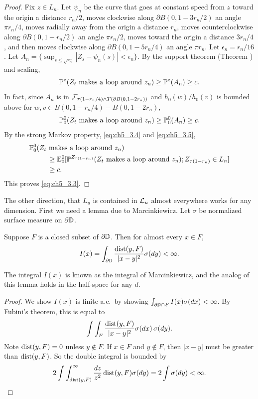 \begin{proof}
Fix $z \in L_n$. Let $\psi_n$ be the curve that goes at constant speed from $z$ toward the origin a distance $r_n/2$, moves clockwise along $\partial B(0,1-3r_n/2)$ an angle $\pi r_n/4$, moves radially away from the origin a distance $r_n$, moves counterclockwise along $\partial B(0,1-r_n/2)$ an angle $\pi r_n/2$, moves toward the origin a distance $3r_n/4$, and then moves clockwise along $\partial B(0,1-5r_n/4)$ an angle $\pi r_n$. Let $\epsilon_n = r_n/16$. Let $A_n = \{\sup_{s\leq\sqrt{r_n}} |Z_s - \psi_n(s)| < \epsilon_n\}$. By the support theorem (Theorem ) and scaling,
\[
    \P^z(Z_t~\text{makes a loop around}~z_n) \geq \P^z(A_n) \geq c.
\]
In fact, since $A_n$ is in $\FC_{\tau(1-r_n/4)\wedge T(\partial B(0,1-2r_n))}$ and $h_0(w)/h_0(v)$ is bounded above for $w,v \in B(0,1-r_n/4) - B(0,1-2r_n)$,
\begin{equation}\label{eq:ch5_3.5}
    \P_0^0(Z_t~\text{makes a loop around}~z_n) \geq \P_0^0(A_n) \geq c.
\end{equation}
By the strong Markov property, \eqref{eq:ch5_3.4} and \eqref{eq:ch5_3.5},
\begin{align*}
    \P_0^0(Z_t~&\text{makes a loop around}~z_n)  \\
    &\!\geq \E_0^0[\P^{Z_{\tau(1-r_n)}}(Z_t~\text{makes a loop around}~z_n); Z_{\tau(1-r_n)} \in L_n] \\
    &\!\geq c.
\end{align*}
This proves \eqref{eq:ch5_3.3}.
\end{proof}

The other direction, that $L_u$ is contained in $\LC_u$ almost everywhere works for any dimension. First we need a lemma due to Marcinkiewicz. Let $\sigma$ be normalized surface measure on $\partial\D$.

\begin{lemma}\label{lem:ch5_3.2}
Suppose $F$ is a closed subset of $\partial\D$. Then for almost every $x \in F$,
\begin{equation}\label{eq:ch5_3.6}
    I(x) = \int_{\partial\D} \frac{\dist(y,F)}{|x-y|^2} \sigma(dy) < \infty.
\end{equation}
\end{lemma}

The integral $I(x)$ is known as the integral of Marcinkiewicz, and the analog of this lemma holds in the half-space for any $d$.

\begin{proof}
We show $I(x)$ is finite a.e.\ by showing $\int_{\partial\D\cap F} I(x)\sigma(dx) < \infty$. By Fubini's theorem, this is equal to
\[
    \int\int_F \frac{\dist(y,F)}{|x-y|^2}\sigma(dx)\,\sigma(dy).
\]
Note $\dist(y,F) = 0$ unless $y \notin F$. If $x \in F$ and $y \notin F$, then $|x-y|$ must be greater than $\dist(y,F)$. So the double integral is bounded by
\[
    2\int\int_{\dist(y,F)}^\infty \frac{dz}{z^2}\dist(y,F)\sigma(dy) = 2\int \sigma(dy) < \infty.
\]
\end{proof}

